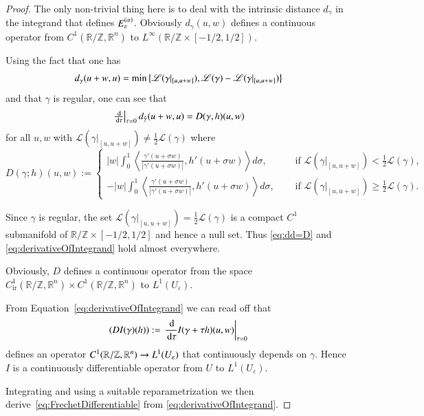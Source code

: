\begin{proof}
The only non-trivial thing here is to deal with the intrinsic distance $d_{\gamma}$ in the integrand 
that defines $E_{\varepsilon}^{(\alpha)}$. Obviously $d_\gamma(u,w)$ defines a continuous 
operator from $C^1 (\mathbb R / \mathbb Z, \mathbb R^n)$ to 
$L^\infty(\mathbb R / \mathbb Z \times [-1/2, 1/2])$.

Using the fact that one has
\begin{equation*}
 d_\gamma(u+w,u)= \min\left\{ \mathscr L(\gamma|_{[u,u+w]}),  \mathscr L (\gamma) - \mathscr L(\gamma|_{[u,u+w]})\right\}
\end{equation*}
and that $\gamma$ is regular, one can see that 
\begin{equation}\label{eq:dd=D}
 \left.\tfrac{\,\mathrm{d}}{\,\mathrm{d}\tau}\right|_{\tau=0} d_{\tilde\gamma} (u+w,u) = D(\gamma,h)(u,w)
\end{equation}
for all $u,w$ with $\mathscr L(\gamma|_{[u,u+w]}) \not= \frac 12 {\mathscr L (\gamma)}$ where
\begin{equation}\label{eq:Dgh}
 D(\gamma;h)(u,w) := \begin{cases} |w|\int_{0}^1 
    \left\langle \frac {\gamma'(u+\sigma w)}{|\gamma'(u+\sigma w)|} , h'(u+\sigma w) \right\rangle d\sigma,
    &\quad\text{ if } \mathscr L(\gamma|_{[u,u+w]}) <\frac 1 2 \mathscr L(\gamma),\\
    -|w|\int_{0}^1
    \left\langle  \frac {\gamma'(u+\sigma w)}{|\gamma'(u+\sigma w)|} , h'(u+\sigma w) \right\rangle d\sigma,
    &\quad\text{ if } \mathscr L(\gamma|_{[u,u+w]}) \geq \frac 1 2 \mathscr L(\gamma).
    \end{cases}
\end{equation}

Since $\gamma$ is regular, the set $\mathscr L(\gamma|_{[u,u+w]}) = \frac 1 2 \mathscr L(\gamma)$
is a compact $C^1$ submanifold of 
$\mathbb R/ \mathbb Z\times [-1/2, 1/2]$ and hence a null set. Thus
\eqref{eq:dd=D} and \eqref{eq:derivativeOfIntegrand} hold almost everywhere.

Obviously, $D$ defines a continuous operator from the space
$C_{\mathrm{ir}}^1(\mathbb R / \mathbb Z, \mathbb R^n) \times C^1 (\mathbb R / \mathbb Z, \mathbb R^n)$
to $L^1(U_{\varepsilon})$.

From Equation~\eqref{eq:derivativeOfIntegrand} we can read off that 
\begin{equation*}
 \left(D I (\gamma)(h)\right) := \left. \frac {\,\mathrm{d}}{\,\mathrm{d}\tau} I(\gamma + \tau h)(u,w) \right|_{\tau =0}
\end{equation*}
defines an operator $C^1(\mathbb{R}/\mathbb{Z},\mathbb{R}^n)\to L^1(U_\varepsilon)$ that
continuously depends on $\gamma$.
Hence $I$ is a continuously differentiable operator from $U$ to $L^1(U_\varepsilon)$.

Integrating and using a suitable reparametrization we then derive~\eqref{eq:FrechetDifferentiable}
from \eqref{eq:derivativeOfIntegrand}.
\end{proof} 

